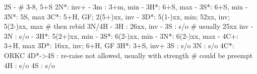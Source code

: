 2S - # 3-8, 5+S
2N*: inv+
   - 3m : 3+m, min
   - 3H*: 6+S, max
   - 3S*: 6+S, min
   - 3N*: 5S, max
3C*: 5+H, GF; 2(5+)xx, inv
   - 3D*: 5(1-)xx, min; 52xx, inv; 5(2-)xx, max  # then rebid 3N/4H
        - 3H : 26xx, inv
        - 3S : s/o  # usually 25xx inv
        - 3N : s/o
   - 3H*: 5(2+)xx, min
   - 3S*: 6(2-)xx, min
   - 3N*: 6(2-)xx, max
   - 4C+: 3+H, max
3D*: 16xx, inv; 6+H, GF
3H*: 3+S, inv+
3S : s/o
3N : s/o
4C*: ORKC
4D*->4S : re-raise not allowed, usually with strength  # could be preempt
4H : s/o
4S : s/o
